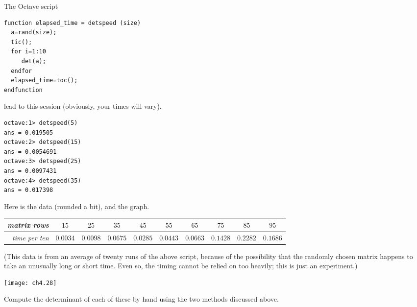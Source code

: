 \begin{exercises}
\begin{answer}
\begin{exparts}
          The Octave script
\begin{lstlisting}
function elapsed_time = detspeed (size)
  a=rand(size);
  tic();
  for i=1:10
     det(a);
  endfor
  elapsed_time=toc();
endfunction
\end{lstlisting}  
          lead to this session (obviously, your times will vary). 
\begin{lstlisting}
octave:1> detspeed(5)
ans = 0.019505
octave:2> detspeed(15)
ans = 0.0054691
octave:3> detspeed(25)
ans = 0.0097431
octave:4> detspeed(35)
ans = 0.017398
\end{lstlisting}  
          \partsitem Here is the data (rounded a bit), and the graph.
            \begin{center}
              \begin{tabular}{r|ccccccccc}
                 \textit{matrix rows} 
                    &$15$ &$25$ &$35$ &$45$ &$55$ &$65$ &$75$ &$85$ &$95$ \\
                 \hline
                 \textit{time per ten}
                    &$0.0034$                     
                    &$0.0098$
                    &$0.0675$
                    &$0.0285$ 
                    &$0.0443$
                    &$0.0663$ 
                    &$0.1428$  
                    &$0.2282$ 
                    &$0.1686$              
              \end{tabular}
            \end{center}
          (This data is from an average of twenty runs of the above script,
          because of the possibility that the randomly chosen matrix
          happens to take an unusually long or short time.
          Even so, the timing cannot be relied on too heavily; this is
          just an experiment.)
          \begin{center}
            \texttt{[image: ch4.28]}
          \end{center}
      \end{exparts}
    \end{answer}
  \item 
    Compute the determinant of each of these by hand using the 
    two methods discussed above.
\end{exercises}
